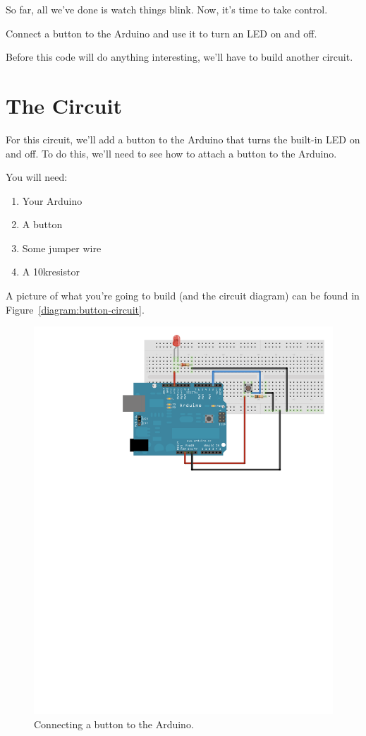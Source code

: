 So far, all we've done is watch things blink. Now, it's time to take control.

\GOALS
Connect a button to the Arduino and use it to turn an LED on and off.

\CODE


Before this code will do anything interesting, we'll have to build another circuit.

\section{The Circuit}
For this circuit, we'll add a button to the Arduino that turns the built-in LED on and off. To do this, we'll need to see how to attach a button to the Arduino.

You will need:
\begin{enumerate}
	\item Your Arduino
	\item A button
	\item Some jumper wire
	\item A 10k\ohm resistor
\end{enumerate}

A picture of what you're going to build (and the circuit diagram) can be found in Figure~\vref{diagram:button-circuit}.

\begin{figure}[h]
  \begin{center}
    \includegraphics[width=0.6\linewidth]{images/ch4-button-circuit}
    \caption{Connecting a button to the Arduino.}
    \label{diagram:ch4-button-circuit}
  \end{center}
\end{figure}

